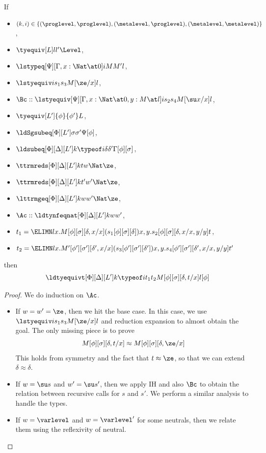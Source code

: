 \begin{lemma}
  If
  \begin{itemize}
  \item $(k, i) \in \{(\proglevel, \proglevel), (\metalevel, \proglevel), (\metalevel, \metalevel)\}$,
  \item $\tyequiv[L]l{l'}\Level$,
  \item $\lstypeq[\Psi][\Gamma, x : \Nat \at 0] i M{M'} l$,
  \item $\lstyequiv i {s_1}{s_3} {M[\ze/x]}l$, 
  \item $\Bc :: \lstyequiv[\Psi][\Gamma, x : \Nat \at 0, y : M \at l] i{s_2}{s_4}{M[\su
      x/x]}l$,
  \item $\tyequiv[L']{\phi}{\phi'}L$,
  \item $\ldSgsubeq[\Phi][L'] \sigma{\sigma'}{\Psi[\phi]}$,
  \item $\ldsubeq[\Phi][\Delta][L'] k{\typeof i} \delta{\delta'}{\Gamma[\phi][\sigma]}$,
  \item $\ttrmreds[\Phi][\Delta][L'] k t w \Nat \ze$,
  \item $\ttrmreds[\Phi][\Delta][L'] k{t'}{w'}\Nat \ze$,
  \item $\lttrmgeq[\Phi][\Delta][L'] k w{w'}\Nat\ze$, 
  \item $\Ac :: \ldtynfeqnat[\Phi][\Delta][L'] k w{w'}$,
  \item
    $t_1 = {\ELIMN
      l{x.M[\phi][\sigma][\delta,x/x]}{(s_1[\phi][\sigma][\delta])}{x,y. s_2[\phi][\sigma][\delta,x/x,y/y]}{t}}$,
  \item $t_2 = {\ELIMN
      l{x.M'[\phi'][\sigma'][\delta',x/x]}{(s_3[\phi'][\sigma'][\delta'])}{x,y. s_4[\phi'][\sigma'][\delta',x/x,y/y]}{t'}}$
  \end{itemize}
  then
  \[
    \ldtyequivt[\Phi][\Delta][L'] k{\typeof i}{t_1}{t_2}{M[\phi][\sigma][\delta, t/x]}{l[\phi]}
  \]
\end{lemma}
\begin{proof}
  We do induction on $\Ac$.
  \begin{itemize}
  \item If $w = w' = \ze$, then we hit the base case. In this case, we use $\lstyequiv
    i {s_1}{s_3} {M[\ze/x]}l$ and reduction expansion to almost obtain the goal. %
    The only missing piece is to prove
    \[
      M[\phi][\sigma][\delta, t/x] \approx M[\phi][\sigma][\delta, \ze/x]
    \]
    This holds from symmetry and the fact that $t \approx \ze$, so that we can extend
    $\delta \approx \delta$.
  \item If $w = \su s$ and $w' = \su s'$, then we apply IH and also $\Bc$ to obtain
    the relation between recursive calls for $s$ and $s'$. %
    We perform a similar analysis to handle the types.
  \item If $w = \varlevel$ and $w = \varlevel'$ for some neutrals, then we relate them using the
    reflexivity of neutral.
  \end{itemize}
\end{proof}

